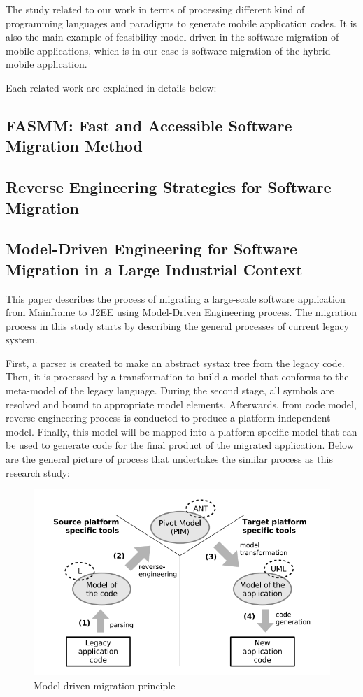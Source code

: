\documentclass[conference]{IEEEtran}
\begin{document}
The \cite{b4} study related to our work in terms of processing different kind of 
programming languages and paradigms to generate mobile application codes. It is also 
the main example of feasibility model-driven in the software migration of mobile applications,
which is in our case is software migration of the hybrid mobile application.

Each related work are explained in details below:
\subsection{ FASMM: Fast and Accessible Software Migration Method }

\subsection{ Reverse Engineering Strategies for Software Migration }

\subsection{ Model-Driven Engineering for Software Migration in a Large Industrial Context }
This paper describes the process of migrating a large-scale software application from Mainframe to J2EE
using Model-Driven Engineering process. The migration process in this study starts by describing the general 
processes of current legacy system.

First, a parser is created to make an abstract systax tree from the legacy code. Then, it is processed
by a transformation to build a model that conforms to the meta-model of the legacy language.
During the second stage, all symbols are resolved and bound to appropriate model elements.
Afterwards, from code model, reverse-engineering process is conducted to produce a platform independent 
model. Finally, this model will be mapped into a platform specific model that can be used to generate code
for the final product of the migrated application. Below are the general picture of process that
undertakes the similar process as this research study:

\begin{figure}[htbp]
\centerline{\includegraphics{fig2.png}}
\caption{Model-driven migration principle \cite{b3}}
\label{fig}
\end{figure}
\end{document}
